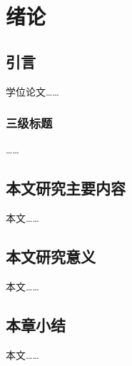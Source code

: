 \chapter{绪论}

\section{引言}

学位论文……\cite{zhangkun1994}

\subsection{三级标题}

……

\section{本文研究主要内容}

本文……

\section{本文研究意义}

本文……

\section{本章小结}

本文……
